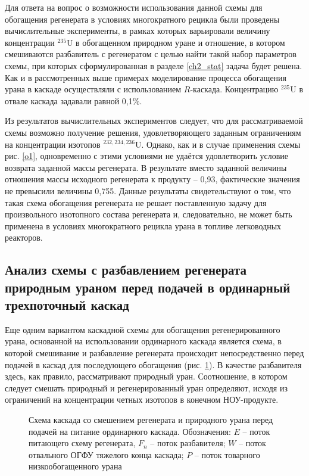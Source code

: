 Для ответа на вопрос о возможности использования данной схемы для обогащения регенерата в условиях многократного рецикла были проведены вычислительные эксперименты, в рамках которых варьировали величину концентрации $^{235}$U в обогащенном природном уране и отношение, в котором смешиваются разбавитель с регенератом с целью найти такой набор параметров схемы, при которых сформулированная в разделе \ref{ch2_stat} задача будет решена. Как и в рассмотренных выше примерах моделирование процесса обогащения урана в каскаде осуществляли с использованием $R$-каскада. Концентрацию $^{235}$U в отвале каскада задавали равной 0,1\%.

Из результатов вычислительных экспериментов следует, что для рассматриваемой схемы возможно получение решения, удовлетворяющего заданным ограничениям на концентрации изотопов $^{232,234,236}$U. Однако, как и в случае применения схемы рис. \ref{o1}, одновременно с этими условиями не удаётся удовлетворить условие возврата заданной массы регенерата. В результате вместо заданной величины отношения массы исходного регенерата к продукту -- 0,93, фактические значения не превысили величины 0,755. Данные результаты свидетельствуют о том, что такая схема обогащения регенерата не решает поставленную задачу для произвольного изотопного состава регенерата и, следовательно, не может быть применена в условиях многократного рецикла урана в топливе легководных реакторов.

\subsection{Анализ схемы с разбавлением регенерата природным ураном перед подачей в ординарный трехпоточный каскад}

Еще одним вариантом каскадной схемы для обогащения регенерированного урана, основанной на использовании ординарного каскада является схема, в которой смешивание и разбавление регенерата происходит непосредственно перед подачей в каскад для последующего обогащения (рис. \ref{o3}). В качестве разбавителя здесь, как правило, рассматривают природный уран. Соотношение, в котором следует смешать природный и регенерированный уран определяют, исходя из ограничений на концентрации четных изотопов в конечном НОУ-продукте.

\begin{figure}[ht]
  \caption{Схема каскада со смешением регенерата и природного урана перед подачей на питание ординарного каскада. Обозначения: $E$ -- поток питающего схему регенерата, $F_n$ -- поток разбавителя; $W$ -- поток отвального ОГФУ тяжелого конца каскада; $P$ -- поток товарного низкообогащенного урана}\label{o3}
\end{figure}

